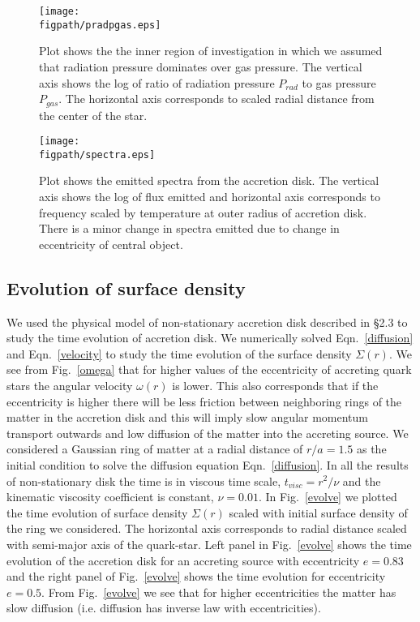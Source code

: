 \documentclass[useAMS,usenatbib]{mn2e}
\newcommand{\figpath}{./Figs/}
\begin{document}
\begin{figure}
\centering
\texttt{[image: \\figpath/pradpgas.eps]}
\caption{Plot shows the the inner region of investigation in which we assumed that radiation pressure dominates over gas pressure. The vertical axis shows the log of ratio of radiation pressure $P_{rad}$ to gas pressure $P_{gas}$. The horizontal axis corresponds to scaled radial distance from the center of the star.}
\label{prpg}
\end{figure}
\begin{figure}
\centering
\texttt{[image: \\figpath/spectra.eps]}
\caption{Plot shows the emitted spectra from the accretion disk. The vertical axis shows the log of flux emitted and horizontal axis corresponds to frequency scaled by temperature at outer radius of accretion disk. There is a minor change in spectra emitted due to change in eccentricity of central object.}
\label{spectra}
\end{figure}
\subsection{Evolution of surface density}
We used the physical model of non-stationary accretion disk described in \S2.3 to study the time evolution of accretion disk. We numerically solved Eqn.~\ref{diffusion} and Eqn.~\ref{velocity} to study the time evolution of the surface density $\Sigma(r)$. We see from Fig.~\ref{omega} that for higher values of the eccentricity of accreting quark stars the angular velocity $\omega(r)$ is lower. This also corresponds that if the eccentricity is higher there will be less friction between neighboring rings of the matter in the accretion disk and this will imply slow angular momentum transport outwards and low diffusion of the matter into the accreting source. We considered a Gaussian ring of matter at a radial distance of $r/a = 1.5$ as the initial condition to solve the diffusion equation Eqn.~\ref{diffusion}. In all the results of non-stationary disk the time is in viscous time scale, $t_{visc} = r^2/\nu$ and the kinematic viscosity coefficient is constant, $\nu = 0.01$. In Fig.~\ref{evolve} we plotted the time evolution of surface density $\Sigma(r)$ scaled with initial surface density of the ring we considered. The horizontal axis corresponds to radial distance scaled with semi-major axis of the quark-star. Left panel in Fig.~\ref{evolve} shows the time evolution of the accretion disk for an accreting source with eccentricity $e = 0.83$ and the right panel of Fig.~\ref{evolve} shows the time evolution for eccentricity $e = 0.5$. From Fig.~\ref{evolve} we see that for higher eccentricities the matter has slow diffusion (i.e. diffusion has inverse law with eccentricities).
\end{document}
